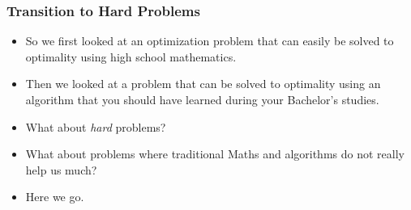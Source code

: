 \documentclass[aspectratio=169,mathserif,notheorems]{beamer}%
\begin{document}
%
\begin{frame}%
\frametitle{Transition to Hard Problems}%
\begin{itemize}%
\item So we first looked at an optimization problem that can easily be solved to optimality using high school mathematics.%
%
\item<2-> Then we looked at a problem that can be solved to optimality using an algorithm that you should have learned during your Bachelor's studies.%
%
\item<3-> What about \emph{hard} problems?%
%
\item<4-> What about problems where traditional Maths and algorithms do not really help us much?%
%
\item<5-> Here we go.%
\end{itemize}%
\end{frame}%
%
%
%
%
\end{document}
